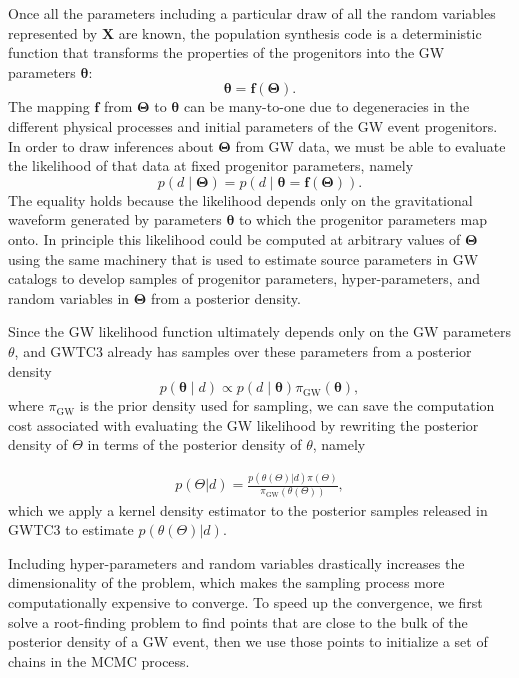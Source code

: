 \documentclass[twocolumn]{aastex631}
\begin{document}
Once all the parameters including a particular draw of all the random variables
represented by $\bm{X}$ are known, the population synthesis code is a
deterministic function that transforms the properties of the progenitors into
the GW parameters $\bm{\theta}$:
\begin{equation}
    \bm{\theta} = \bm{f}\left( \bm{\Theta} \right).
\end{equation}
The mapping $\bm{f}$ from $\bm{\Theta}$ to $\bm{\theta}$ can be many-to-one
due to degeneracies in the different physical processes and initial parameters  
of the GW event progenitors.
In order to draw inferences about $\bm{\Theta}$ from GW data, we
must be able to evaluate the likelihood of that data at fixed progenitor
parameters, namely
\begin{equation}
    p\left( d \mid \bm{\Theta} \right) = p\left( d \mid \bm{\theta} = \bm{f}\left( \bm{\Theta} \right) \right).
\end{equation}
The equality holds because the likelihood depends only on the gravitational waveform generated by
parameters $\bm{\theta}$ to which the progenitor parameters map onto.  In principle
this likelihood could be computed at arbitrary values of $\bm{\Theta}$ using the
same machinery that is used to estimate source parameters in GW
catalogs \citep{Veitch2015,Ashton2019,Romero-Shaw2020,GWTC-3} to develop samples
of progenitor parameters, hyper-parameters, and random variables in
$\bm{\Theta}$ from a posterior density.

Since the GW likelihood function
ultimately depends only on the GW parameters $\theta$, and GWTC3 already has samples over these parameters from a posterior density 
\begin{equation}
    p\left( \bm{\theta} \mid d \right) \propto p\left( d \mid \bm{\theta} \right) \pi_\mathrm{GW} \left( \bm{\theta} \right),
\end{equation}
where $\pi_\mathrm{GW}$ is the prior density used for sampling,
we can save the computation cost associated with evaluating the GW likelihood by rewriting the posterior 
density of $\Theta$ in terms of the posterior density of $\theta$, namely

\begin{align}
    p(\Theta | d) = \frac{p(\theta(\Theta)| d) \pi(\Theta)}{\pi_\mathrm{GW}(\theta(\Theta))},
\end{align}
which we apply a kernel density estimator to the posterior samples released in GWTC3 to estimate $p(\theta(\Theta)|d)$.

Including hyper-parameters and random variables %
drastically increases the dimensionality of the problem,
which makes the sampling process more computationally expensive to converge.
To speed up the convergence, we first solve a root-finding problem to find points that are close to the bulk of the posterior density of a GW event,
then we use those points to initialize a set of chains in the MCMC process.
\end{document}
